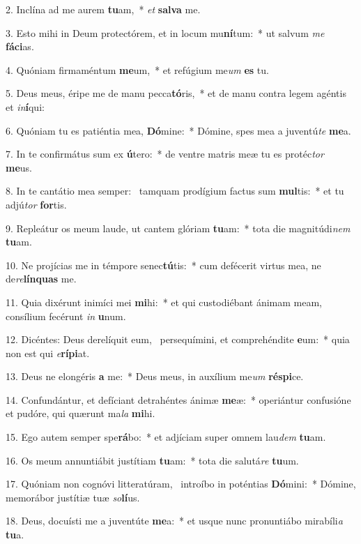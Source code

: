 2. Inclína ad me aurem \textbf{tu}am,~*  \textit{et} \textbf{sal}\textbf{va} me.\

3. Esto mihi in Deum protectórem, et in locum mu\textbf{ní}tum:~*  ut salvum \textit{me} \textbf{fá}\textbf{ci}as.\

4. Quóniam firmaméntum \textbf{me}um,~*  et refúgium me\textit{um} \textbf{es} tu.\

5. Deus meus, éripe me de manu pecca\textbf{tó}ris,~*  et de manu contra legem agéntis et \textit{in}\textbf{í}qui:\

6. Quóniam tu es patiéntia mea, \textbf{Dó}mine:~*  Dómine, spes mea a juventú\textit{te} \textbf{me}a.\

7. In te confirmátus sum ex \textbf{ú}tero:~*  de ventre matris meæ tu es protéc\textit{tor} \textbf{me}us.\

8. In te cantátio mea semper: \dag\  tamquam prodígium factus sum \textbf{mul}tis:~*  et tu adjú\textit{tor} \textbf{for}tis.\

9. Repleátur os meum laude, ut cantem glóriam \textbf{tu}am:~*  tota die magnitúdi\textit{nem} \textbf{tu}am.\

10. Ne projícias me in témpore senec\textbf{tú}tis:~*  cum defécerit virtus mea, ne de\textit{re}\textbf{lín}\textbf{quas} me.\

11. Quia dixérunt inimíci mei \textbf{mi}hi:~*  et qui custodiébant ánimam meam, consílium fecérunt \textit{in} \textbf{u}num.\

12. Dicéntes: Deus derelíquit eum, \dag\  persequímini, et comprehéndite \textbf{e}um:~*  quia non est qui \textit{e}\textbf{rí}\textbf{pi}at.\

13. Deus ne elongéris \textbf{a} me:~*  Deus meus, in auxílium me\textit{um} \textbf{ré}\textbf{spi}ce.\

14. Confundántur, et defíciant detrahéntes ánimæ \textbf{me}æ:~*  operiántur confusióne et pudóre, qui quærunt ma\textit{la} \textbf{mi}hi.\

15. Ego autem semper spe\textbf{rá}bo:~*  et adjíciam super omnem lau\textit{dem} \textbf{tu}am.\

16. Os meum annuntiábit justítiam \textbf{tu}am:~*  tota die salutá\textit{re} \textbf{tu}um.\

17. Quóniam non cognóvi litteratúram, \dag\  introíbo in poténtias \textbf{Dó}mini:~*  Dómine, memorábor justítiæ tuæ \textit{so}\textbf{lí}us.\

18. Deus, docuísti me a juventúte \textbf{me}a:~*  et usque nunc pronuntiábo mirabíli\textit{a} \textbf{tu}a.\

